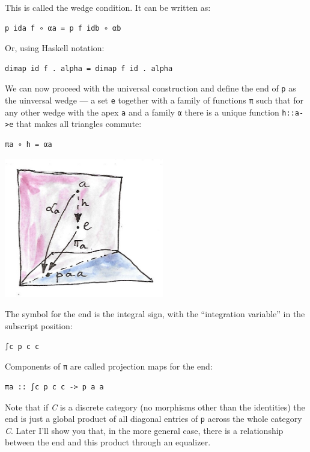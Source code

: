 This is called the wedge condition. It can be written as:

\begin{verbatim}
p ida f ∘ αa = p f idb ∘ αb
\end{verbatim}

Or, using Haskell notation:

\begin{verbatim}
dimap id f . alpha = dimap f id . alpha
\end{verbatim}

We can now proceed with the universal construction and define the end of
\texttt{p} as the uinversal wedge --- a set \texttt{e} together with a
family of functions \texttt{π} such that for any other wedge with the
apex \texttt{a} and a family \texttt{α} there is a unique function
\texttt{h::a-\textgreater{}e} that makes all triangles commute:

\begin{verbatim}
πa ∘ h = αa
\end{verbatim}

\includegraphics[width=2.73958in]{images/end-21.jpg}

The symbol for the end is the integral sign, with the ``integration
variable'' in the subscript position:

\begin{verbatim}
∫c p c c
\end{verbatim}

Components of \texttt{π} are called projection maps for the end:

\begin{verbatim}
πa :: ∫c p c c -> p a a
\end{verbatim}

Note that if \emph{C} is a discrete category (no morphisms other than
the identities) the end is just a global product of all diagonal entries
of \texttt{p} across the whole category \emph{C}. Later I'll show you
that, in the more general case, there is a relationship between the end
and this product through an equalizer.

